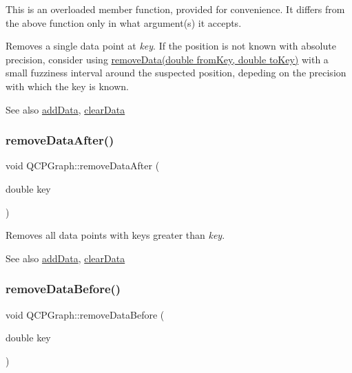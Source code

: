 This is an overloaded member function, provided for convenience. It differs from the above function only in what argument(s) it accepts.

Removes a single data point at {\itshape key}. If the position is not known with absolute precision, consider using \hyperlink{class_q_c_p_graph_a4a0fde50b7db9db0a85b5c5b6b10098f}{remove\+Data(double from\+Key, double to\+Key)} with a small fuzziness interval around the suspected position, depeding on the precision with which the key is known.

\begin{DoxySeeAlso}{See also}
\hyperlink{class_q_c_p_graph_aa5c6181d84db72ce4dbe9dc15a34ef4f}{add\+Data}, \hyperlink{class_q_c_p_graph_ad4e94a4e44e5e76fbec81a72a977157d}{clear\+Data} 
\end{DoxySeeAlso}
\hypertarget{class_q_c_p_graph_ae42d645ef617cfc75fc0df58e62c522a}{}\label{class_q_c_p_graph_ae42d645ef617cfc75fc0df58e62c522a} 
\subsubsection{\texorpdfstring{remove\+Data\+After()}{removeDataAfter()}}
{\footnotesize\ttfamily void Q\+C\+P\+Graph\+::remove\+Data\+After (\begin{DoxyParamCaption}\item[{double}]{key }\end{DoxyParamCaption})}

Removes all data points with keys greater than {\itshape key}. \begin{DoxySeeAlso}{See also}
\hyperlink{class_q_c_p_graph_aa5c6181d84db72ce4dbe9dc15a34ef4f}{add\+Data}, \hyperlink{class_q_c_p_graph_ad4e94a4e44e5e76fbec81a72a977157d}{clear\+Data} 
\end{DoxySeeAlso}
\hypertarget{class_q_c_p_graph_a9fe0b3e54e8c7b61319bd03337e21e99}{}\label{class_q_c_p_graph_a9fe0b3e54e8c7b61319bd03337e21e99} 
\subsubsection{\texorpdfstring{remove\+Data\+Before()}{removeDataBefore()}}
{\footnotesize\ttfamily void Q\+C\+P\+Graph\+::remove\+Data\+Before (\begin{DoxyParamCaption}\item[{double}]{key }\end{DoxyParamCaption})}

